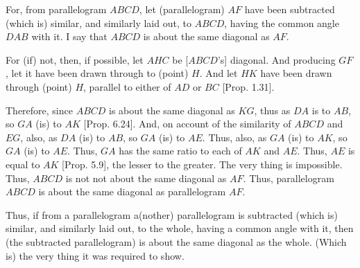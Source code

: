 \begin{Parallel}{}{}
{For, from parallelogram $ABCD$, let (parallelogram) $AF$ have been
subtracted (which is) similar, and similarly laid out,  to $ABCD$,
having  the common angle $DAB$ with it. I say that $ABCD$ is about
the same diagonal as $AF$.

\epsfysize=2in
\centerline{}

For (if) not, then, if possible, let $AHC$ be [$ABCD$'s] diagonal. And producing
$GF$, let it have been drawn through to (point) $H$. And let $HK$ have
been drawn through (point) $H$, parallel to either of $AD$ or $BC$  [Prop. 1.31].

Therefore, since $ABCD$ is about the same diagonal as $KG$, thus as
$DA$ is to $AB$, so $GA$ (is) to $AK$ [Prop. 6.24].
And, on account of the similarity of $ABCD$ and $EG$, also, as $DA$ (is)
to $AB$, so $GA$ (is) to $AE$. Thus, also, as $GA$ (is) to $AK$, so $GA$ (is)
to $AE$. Thus, $GA$ has the same ratio  to each of $AK$ and $AE$. Thus, 
$AE$ is equal to $AK$ [Prop. 5.9], the
lesser to the greater. The very thing is impossible. Thus, $ABCD$ is not not
about the same diagonal as $AF$. Thus, parallelogram $ABCD$ is
about the same diagonal as parallelogram $AF$.

Thus, if from a parallelogram a(nother) parallelogram
is subtracted (which is) similar, and similarly laid out, to the whole,
having a common angle with it, then (the subtracted parallelogram) is about the same diagonal
as the whole. (Which is) the very thing it was required to show.}
\end{Parallel}


